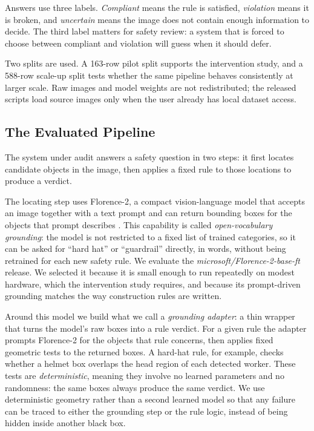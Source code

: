 \documentclass[conference]{IEEEtran}
\begin{document}
Answers use three labels. \textit{Compliant} means the rule is satisfied, \textit{violation} means it is broken, and \textit{uncertain} means the image does not contain enough information to decide. The third label matters for safety review: a system that is forced to choose between compliant and violation will guess when it should defer.

Two splits are used. A 163-row pilot split supports the intervention study, and a 588-row scale-up split tests whether the same pipeline behaves consistently at larger scale. Raw images and model weights are not redistributed; the released scripts load source images only when the user already has local dataset access.

\subsection{The Evaluated Pipeline}

The system under audit answers a safety question in two steps: it first locates candidate objects in the image, then applies a fixed rule to those locations to produce a verdict.

The locating step uses Florence-2, a compact vision-language model that accepts an image together with a text prompt and can return bounding boxes for the objects that prompt describes \cite{xiao2024}. This capability is called \textit{open-vocabulary grounding}: the model is not restricted to a fixed list of trained categories, so it can be asked for ``hard hat'' or ``guardrail'' directly, in words, without being retrained for each new safety rule. We evaluate the \textit{microsoft/Florence-2-base-ft} release. We selected it because it is small enough to run repeatedly on modest hardware, which the intervention study requires, and because its prompt-driven grounding matches the way construction rules are written.

Around this model we build what we call a \textit{grounding adapter}: a thin wrapper that turns the model's raw boxes into a rule verdict. For a given rule the adapter prompts Florence-2 for the objects that rule concerns, then applies fixed geometric tests to the returned boxes. A hard-hat rule, for example, checks whether a helmet box overlaps the head region of each detected worker. These tests are \textit{deterministic}, meaning they involve no learned parameters and no randomness: the same boxes always produce the same verdict. We use deterministic geometry rather than a second learned model so that any failure can be traced to either the grounding step or the rule logic, instead of being hidden inside another black box.
\end{document}
